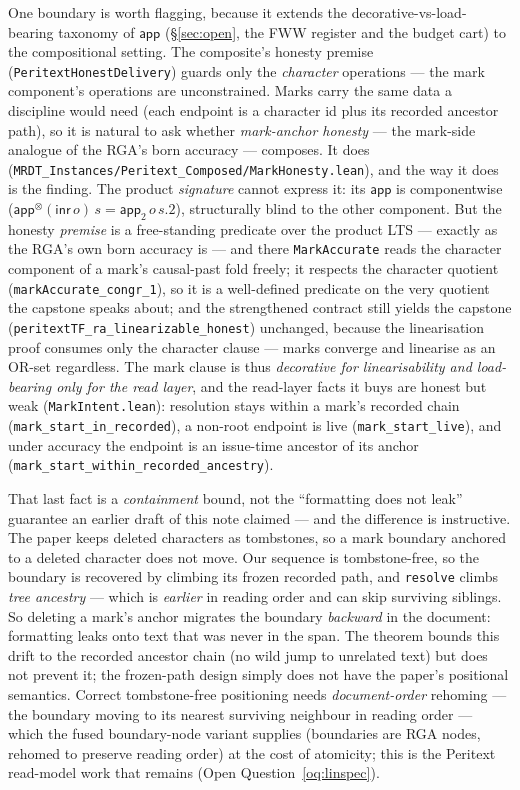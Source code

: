 \documentclass[11pt]{article}
\newcommand{\lean}[1]{\texttt{#1}}
\newcommand{\app}{\mathsf{app}}
\begin{document}
One boundary is worth flagging, because it extends the decorative-vs-load-%
bearing taxonomy of $\app$ (\S\ref{sec:open}, the FWW register and the
budget cart) to the compositional setting. The composite's honesty premise
(\lean{PeritextHonestDelivery}) guards only the \emph{character} operations
--- the mark component's operations are unconstrained. Marks carry the same
data a discipline would need (each endpoint is a character id plus its
recorded ancestor path), so it is natural to ask whether \emph{mark-anchor
honesty} --- the mark-side analogue of the RGA's born accuracy --- composes.
It does (\lean{MRDT\_Instances/Peritext\_Composed/MarkHonesty.lean}), and the way it
does is the finding. The product \emph{signature} cannot express it: its
$\app$ is componentwise ($\app^{\otimes}(\mathsf{inr}\,o)\,s = \app_2\,o\,s.2$),
structurally blind to the other component. But the honesty \emph{premise} is
a free-standing predicate over the product LTS --- exactly as the RGA's own
born accuracy is --- and there \lean{MarkAccurate} reads the character
component of a mark's causal-past fold freely; it respects the character
quotient (\lean{markAccurate\_congr\_1}), so it is a well-defined predicate on
the very quotient the capstone speaks about; and the strengthened contract
still yields the capstone (\lean{peritextTF\_ra\_linearizable\_honest})
unchanged, because the linearisation proof consumes only the character
clause --- marks converge and linearise as an OR-set regardless. The mark
clause is thus \emph{decorative for linearisability and load-bearing only for
the read layer}, and the read-layer facts it buys are honest but weak
(\lean{MarkIntent.lean}): resolution stays within a mark's recorded chain
(\lean{mark\_start\_in\_recorded}), a non-root endpoint is live
(\lean{mark\_start\_live}), and under accuracy the endpoint is an issue-time
ancestor of its anchor (\lean{mark\_start\_within\_recorded\_ancestry}).

That last fact is a \emph{containment} bound, not the ``formatting does not
leak'' guarantee an earlier draft of this note claimed --- and the difference
is instructive. The paper keeps deleted characters as tombstones, so a mark
boundary anchored to a deleted character does not move. Our sequence is
tombstone-free, so the boundary is recovered by climbing its frozen recorded
path, and \lean{resolve} climbs \emph{tree ancestry} --- which is
\emph{earlier} in reading order and can skip surviving siblings. So deleting a
mark's anchor migrates the boundary \emph{backward} in the document:
formatting leaks onto text that was never in the span. The theorem bounds this
drift to the recorded ancestor chain (no wild jump to unrelated text) but does
not prevent it; the frozen-path design simply does not have the paper's
positional semantics. Correct tombstone-free positioning needs
\emph{document-order} rehoming --- the boundary moving to its nearest surviving
neighbour in reading order --- which the fused boundary-node variant supplies
(boundaries are RGA nodes, rehomed to preserve reading order) at the cost of
atomicity; this is the Peritext read-model work that remains
(Open Question~\ref{oq:linspec}).
\end{document}
